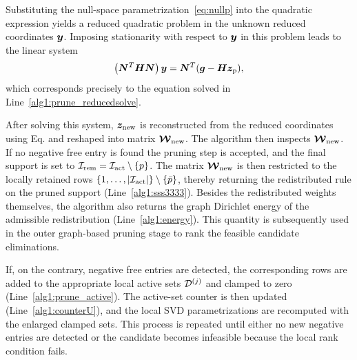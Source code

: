 \documentclass[preprint,10pt]{elsarticle}  %
\begin{document}
Substituting the null-space parametrization~\ref{eq:nullp} into the quadratic expression  yields a reduced quadratic problem in the
unknown reduced coordinates \(\bm{y}\). Imposing stationarity with
respect to \(\bm{y}\) in this problem  leads to the linear system
\begin{equation}
\label{eq:solveY}
\left(\bm{N}^T\bm{H}\bm{N}\right)\bm{y}
=
\bm{N}^T(\bm{g}-\bm{H}\bm{z}_{\mathrm{p}}),
\end{equation}
which corresponds precisely to the equation solved in
Line~\ref{alg1:prune_reducedsolve}.


After solving this system,   \(\bm{z}_{\mathrm{new}}\) is reconstructed from
the reduced coordinates using Eq.  and reshaped into   matrix \(\boldsymbol{\mathcal{W}}_{\mathrm{new}}\). The
algorithm then inspects  \(\boldsymbol{\mathcal{W}}_{\mathrm{new}}\).  If
no negative free entry is found the pruning step is accepted, and the final support is set to
\(\mathcal{I}_{\mathrm{rem}}=\mathcal{I}_{\mathrm{act}}\setminus\{p\}\). The matrix \(\boldsymbol{\mathcal{W}}_{\mathrm{new}}\) is then restricted
to the locally retained rows
\(\{1,\ldots,|\mathcal{I}_{\mathrm{act}}|\}\setminus\{\bar{p}\}\), thereby returning the
redistributed rule on the pruned support
(Line~\ref{alg1:sss3333}).  Besides the redistributed weights themselves, the algorithm also returns the graph Dirichlet
energy of the admissible redistribution
(Line~\ref{alg1:energy}). This quantity is subsequently used in the
outer graph-based pruning stage to rank the feasible candidate
eliminations.

If, on the contrary, negative free entries are detected, the
corresponding rows are added to the appropriate local active sets
\(\mathcal{D}^{(j)}\) and clamped to zero
(Line~\ref{alg1:prune_active}). The active-set counter is then updated
(Line~\ref{alg1:counterU}), and the local SVD parametrizations are
recomputed with the enlarged clamped sets. This process is repeated
until either no new negative entries are detected or the candidate
becomes infeasible because the local rank condition fails.
\end{document}

